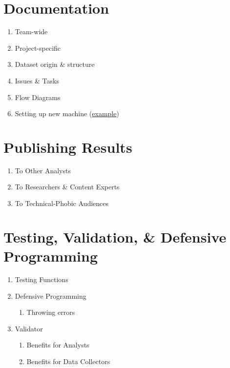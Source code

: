 \documentclass[]{book}
\providecommand{\tightlist}{%
  \setlength{\itemsep}{0pt}\setlength{\parskip}{0pt}}
\theoremstyle{definition}
\theoremstyle{definition}
\theoremstyle{definition}
\theoremstyle{remark}
\begin{document}
\hypertarget{documentation}{%
\chapter{Documentation}\label{documentation}}

\begin{enumerate}
\def\labelenumi{\arabic{enumi}.}
\tightlist
\item
  Team-wide
\item
  Project-specific
\item
  Dataset origin \& structure
\item
  Issues \& Tasks
\item
  Flow Diagrams
\item
  Setting up new machine
  (\href{https://github.com/OuhscBbmc/RedcapExamplesAndPatterns/blob/master/DocumentationGlobal/ResourcesInstallation.md}{example})
\end{enumerate}

\hypertarget{publishing-results}{%
\chapter{Publishing Results}\label{publishing-results}}

\begin{enumerate}
\def\labelenumi{\arabic{enumi}.}
\tightlist
\item
  To Other Analysts
\item
  To Researchers \& Content Experts
\item
  To Technical-Phobic Audiences
\end{enumerate}

\hypertarget{testing-validation-defensive-programming}{%
\chapter{Testing, Validation, \& Defensive
Programming}\label{testing-validation-defensive-programming}}

\begin{enumerate}
\def\labelenumi{\arabic{enumi}.}
\tightlist
\item
  Testing Functions
\item
  Defensive Programming

  \begin{enumerate}
  \def\labelenumii{\arabic{enumii}.}
  \tightlist
  \item
    Throwing errors
  \end{enumerate}
\item
  Validator

  \begin{enumerate}
  \def\labelenumii{\arabic{enumii}.}
  \tightlist
  \item
    Benefits for Analysts
  \item
    Benefits for Data Collectors
  \end{enumerate}
\end{enumerate}
\end{document}
